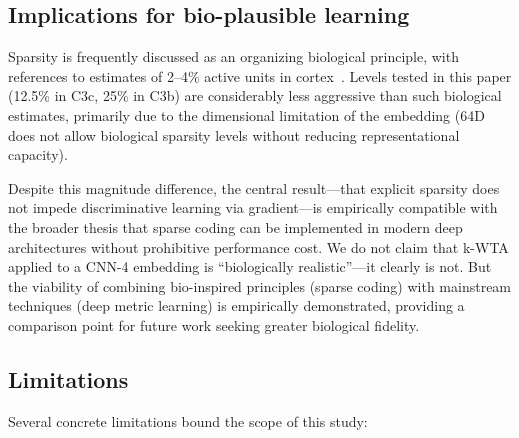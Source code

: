 \documentclass[11pt]{article}
\begin{document}
\subsection{Implications for bio-plausible learning}

Sparsity is frequently discussed as an organizing biological principle, with references to estimates of 2--4\% active units in cortex~\citep{ahmad2019dense}. Levels tested in this paper (12.5\% in C3c, 25\% in C3b) are considerably less aggressive than such biological estimates, primarily due to the dimensional limitation of the embedding (64D does not allow biological sparsity levels without reducing representational capacity).

Despite this magnitude difference, the central result---that explicit sparsity does not impede discriminative learning via gradient---is empirically compatible with the broader thesis that sparse coding can be implemented in modern deep architectures without prohibitive performance cost. We do not claim that k-WTA applied to a CNN-4 embedding is ``biologically realistic''---it clearly is not. But the viability of combining bio-inspired principles (sparse coding) with mainstream techniques (deep metric learning) is empirically demonstrated, providing a comparison point for future work seeking greater biological fidelity.

\subsection{Limitations}

Several concrete limitations bound the scope of this study:
\end{document}
